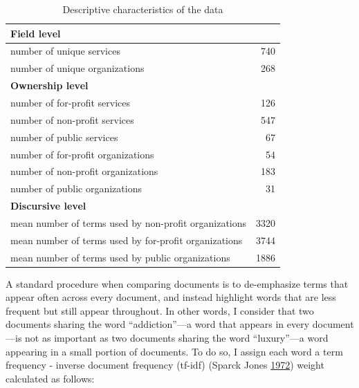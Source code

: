 \documentclass[
  12pt,
]{article}
\begin{document}
\begin{table}

\caption{\label{tab:unnamed-chunk-4}Descriptive characteristics of the data}
\centering
\begin{tabular}[t]{l|r}
\hline
\multicolumn{2}{l}{\textbf{Field level}}\\
\hline
\hspace{1em}number of unique services & 740\\
\hline
\hspace{1em}number of unique organizations & 268\\
\hline
\multicolumn{2}{l}{\textbf{Ownership level}}\\
\hline
\hspace{1em}number of for-profit services & 126\\
\hline
\hspace{1em}number of non-profit services & 547\\
\hline
\hspace{1em}number of public services & 67\\
\hline
\hspace{1em}number of for-profit organizations & 54\\
\hline
\hspace{1em}number of non-profit organizations & 183\\
\hline
\hspace{1em}number of public organizations & 31\\
\hline
\multicolumn{2}{l}{\textbf{Discursive level}}\\
\hline
\hspace{1em}mean number of terms used by non-profit organizations & 3320\\
\hline
\hspace{1em}mean number of terms used by for-profit organizations & 3744\\
\hline
\hspace{1em}mean number of terms used by public organizations & 1886\\
\hline
\end{tabular}
\end{table}

\vspace{12pt}

A standard procedure when comparing documents is to de-emphasize terms that appear often across every document, and instead highlight words that are less frequent but still appear throughout. In other words, I consider that two documents sharing the word ``addiction''---a word that appears in every document---is not as important as two documents sharing the word ``luxury''---a word appearing in a small portion of documents. To do so, I assign each word a term frequency - inverse document frequency (tf-idf) (Sparck Jones \protect\hyperlink{ref-sparckjones1972}{1972}) weight calculated as follows:
\end{document}
